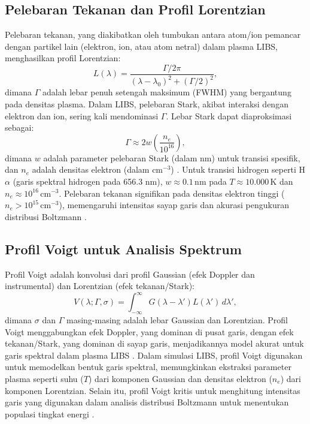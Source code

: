 \subsection{Pelebaran Tekanan dan Profil Lorentzian}
Pelebaran tekanan, yang diakibatkan oleh tumbukan antara atom/ion pemancar dengan partikel lain (elektron, ion, atau atom netral) dalam plasma LIBS, menghasilkan profil Lorentzian:
\begin{equation}
L(\lambda) = \frac{\Gamma / 2\pi}{(\lambda - \lambda_0)^2 + (\Gamma / 2)^2}, \label{eq:lorentzian}
\end{equation}
dimana \( \Gamma \) adalah lebar penuh setengah maksimum (FWHM) yang bergantung pada densitas plasma. Dalam LIBS, pelebaran Stark, akibat interaksi dengan elektron dan ion, sering kali mendominasi \( \Gamma \). Lebar Stark dapat diaproksimasi sebagai:
\begin{equation}
\Gamma \approx 2w \left( \frac{n_e}{10^{16}} \right), \label{eq:stark_broadening}
\end{equation}
dimana \( w \) adalah parameter pelebaran Stark (dalam nm) untuk transisi spesifik, dan \( n_e \) adalah densitas elektron (dalam \( \text{cm}^{-3} \)) \citep{Griem1997,Konjevic1999}. Untuk transisi hidrogen seperti H\(\alpha\) (garis spektral hidrogen pada 656.3 nm), \( w \approx 0.1 \, \text{nm} \) pada \( T \approx 10.000 \, \text{K} \) dan \( n_e \approx 10^{16} \, \text{cm}^{-3} \). Pelebaran tekanan signifikan pada densitas elektron tinggi (\( n_e > 10^{15} \, \text{cm}^{-3} \)), memengaruhi intensitas sayap garis dan akurasi pengukuran distribusi Boltzmann \citep{Aragon2008}.

\subsection{Profil Voigt untuk Analisis Spektrum}
Profil Voigt adalah konvolusi dari profil Gaussian (efek Doppler dan instrumental) dan Lorentzian (efek tekanan/Stark):
\begin{equation}
V(\lambda; \Gamma, \sigma) = \int_{-\infty}^{\infty} G(\lambda - \lambda') L(\lambda') \, d\lambda', \label{eq:voigt}
\end{equation}
dimana \( \sigma \) dan \( \Gamma \) masing-masing adalah lebar Gaussian dan Lorentzian. Profil Voigt menggabungkan efek Doppler, yang dominan di pusat garis, dengan efek tekanan/Stark, yang dominan di sayap garis, menjadikannya model akurat untuk garis spektral dalam plasma LIBS \citep{Griem1997}. Dalam simulasi LIBS, profil Voigt digunakan untuk memodelkan bentuk garis spektral, memungkinkan ekstraksi parameter plasma seperti suhu (\( T \)) dari komponen Gaussian dan densitas elektron (\( n_e \)) dari komponen Lorentzian. Selain itu, profil Voigt kritis untuk menghitung intensitas garis yang digunakan dalam analisis distribusi Boltzmann untuk menentukan populasi tingkat energi \citep{Miziolek2006,Aragon2008}.

